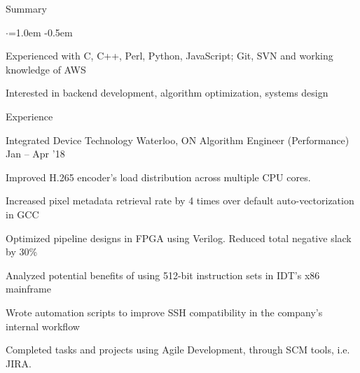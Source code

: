 \documentclass{resume} %
\begin{document}

\begin{rSection}{Summary}
  \vspace{0.5em}
  \begin{list}{$\cdot$}{\leftmargin=1.0em}
    \itemsep -0.5em \vspace{-0.5em}
    \item Experienced with C, C++, Perl, Python, JavaScript; Git, SVN and working knowledge of AWS
	\item Interested in backend development, algorithm optimization, systems design
  \end{list}
  \vspace{0.5em}
\end{rSection}


\begin{rSection}{Experience}
  \begin{rWorkSection}{Integrated Device Technology}
                     {Waterloo, ON}
                     {Algorithm Engineer (Performance)}
                     {Jan -- Apr '18}
    \item Improved H.265 encoder's load distribution across multiple CPU cores.
    \item Increased pixel metadata retrieval rate by 4 times over default 
	  auto-vectorization in GCC
    \item Optimized pipeline designs in FPGA using Verilog. Reduced total
	  negative slack by 30\%
	  \item Analyzed potential benefits of using 512-bit instruction sets in 
	  IDT's x86 mainframe
    \item Wrote automation scripts to improve SSH compatibility in the
	  company's internal workflow
	  \item Completed tasks and projects using Agile Development, through SCM 
    tools, i.e. JIRA.
  \end{rWorkSection}
\end{rSection}
\end{document}

